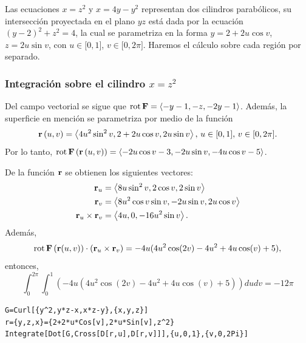 Las ecuaciones $x=z^{2}$ y $x=4y-y^{2}$ representan dos cilindros parabólicos, su intersección proyectada en el plano $yz$ está dada por la ecuación $\left( y-2\right) ^{2}+z^{2}=4$, la cual se parametriza en la forma $y=2+2u\cos v$, $z=2u\sin v$, con $u\in \lbrack 0,1]$, $v\in \lbrack 0,2\pi ]$. Haremos el cálculo sobre cada región por separado.

\enlargethispage*{\baselineskip}

\subsubsection{Integración sobre el cilindro \texorpdfstring{$x=z^{2}$}{x=z^2}}

Del campo vectorial se  sigue que $\operatorname{rot}{\bf F}= \left\langle -y-1,-z,-2y-1\right\rangle $.
Además, la superficie en mención se parametriza por medio de la función
\[{\bf r}\left( u,v\right) =\left\langle 4u^{2}\sin ^{2}v,2+2u\cos v,2u\sin v\right\rangle,\, u\in \lbrack 0,1],\,v\in \lbrack 0,2\pi ].\] Por lo tanto,
$\operatorname{rot}{\bf F}\left({\bf r}\left(u,v\right)\right) = \left\langle -2u\cos v-3,-2u\sin v,-4u\cos v-5\right\rangle $.

De la función ${\bf r}$ se obtienen los siguientes vectores:
\begin{align*}
{\bf r}_{u} &= \left\langle 8u\sin ^{2}v,2\cos v,2\sin v\right\rangle \\
{\bf r}_{v} &=\left\langle 8u^{2}\cos v\sin v,-2u\sin v,2u\cos v\right\rangle \\
{\bf r}_{u}\times {\bf r}_{v} &=\left\langle 4u,0,-16u^{2}\sin v\right\rangle.
\end{align*}
Además,
\[\operatorname{rot}{\bf F}\left({\bf r}(u,v)\right)\cdot\left({\bf r}_{u}\times{\bf r}_{v}\right)=-4 u(4u^2\cos(2v)-4u^2+4 u \cos (v)+5), \]
entonces,
\begin{equation}\label{stokes6}
\int_{0}^{2\pi }\int_{0}^{1}\left( -4 u(4u^2\cos(2v)-4u^2+4 u \cos (v)+5)\right) dudv= -12\pi
\end{equation}

\begin{tcolorbox}[title=\bf Instrucción \verb"Mathematica"]\begin{Verbatim}[formatcom=\letraverbatim]
G=Curl[{y^2,y*z-x,x*z-y},{x,y,z}]
r={y,z,x}={2+2*u*Cos[v],2*u*Sin[v],z^2}
Integrate[Dot[G,Cross[D[r,u],D[r,v]]],{u,0,1},{v,0,2Pi}]
\end{Verbatim}
\end{tcolorbox}

